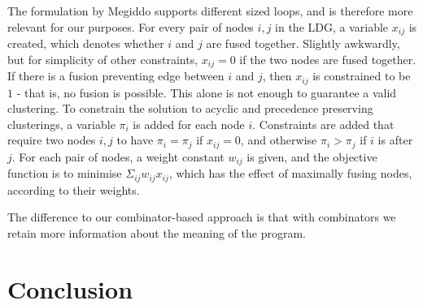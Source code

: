 \documentclass[preprint]{sigplanconf}
\begin{document}
The formulation by Megiddo\cite{megiddo1997optimal} supports different sized loops, and is therefore more relevant for our purposes.
For every pair of nodes $i,j$ in the LDG, a variable $x_{ij}$ is created, which denotes whether $i$ and $j$ are fused together.
Slightly awkwardly, but for simplicity of other constraints, $x_{ij} = 0$ if the two nodes are fused together.
If there is a fusion preventing edge between $i$ and $j$, then $x_{ij}$ is constrained to be $1$ - that is, no fusion is possible.
This alone is not enough to guarantee a valid clustering.
To constrain the solution to acyclic and precedence preserving clusterings, a variable $\pi_i$ is added for each node $i$.
Constraints are added that require two nodes $i,j$ to have $\pi_i = \pi_j$ if $x_{ij} = 0$, and otherwise $\pi_i > \pi_j$ if $i$ is after $j$.
For each pair of nodes, a weight constant $w_{ij}$ is given, and the objective function is to minimise $\Sigma_{ij} w_{ij} x_{ij}$, which has the effect of maximally fusing nodes, according to their weights.

The difference to our combinator-based approach is that with combinators we retain more information about the meaning of the program.

\section{Conclusion}




\end{document}
